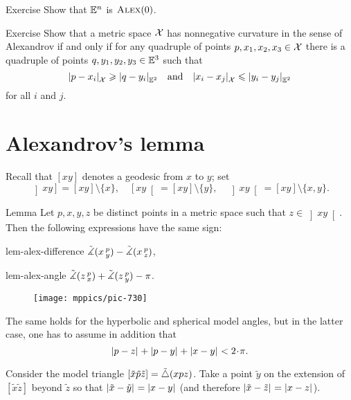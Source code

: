 \begin{thm}{Exercise}\label{ex:Euclid-is-CBB}
Show that $\mathbb{E}^n$ is $\textsc{Alex}(0)$.
\end{thm}

\begin{thm}{Exercise}\label{ex:(3+1)-expanding}
Show that a metric space $\mathcal{X}$ has nonnegative curvature in the sense of Alexandrov
if and only if for any quadruple of points $p,x_1,x_2,x_3\in \mathcal{X}$ 
there is a quadruple of points $q,y_1,y_2,y_3\in\mathbb{E}^3$
such that 
\[\dist{p}{x_i}{\spc{X}}\ge\dist{q}{y_i}{\EE^2} 
\quad \text{and}\quad
\dist{x_i}{x_j}{\spc{X}}\le\dist{y_i}{y_j}{\EE^2}\] 
for all $i$ and $j$.
\end{thm}

\section{Alexandrov's lemma}

Recall that $[xy]$ denotes a geodesic from $x$ to $y$;
set  
\[
\left]x y\right]=[xy]\setminus\{x\},
\quad
\left[x y\right[=[xy]\setminus\{y\},
\quad
\left]x y\right[=[xy]\setminus\{x,y\}.\]

\begin{thm}{Lemma}
\label{lem:alex}  
Let $p,x,y,z$ be distinct points in a metric space such that $z\in \left]x y\right[$.
Then 
the following expressions have the same sign:

\begin{subthm}{lem-alex-difference}
$\tilde\measuredangle(x\,{}^{p}_{y})
-\tilde\measuredangle(x\,{}^{p}_{z})$,
\end{subthm} 

\begin{subthm}{lem-alex-angle}
$\tilde\measuredangle(z\,{}^{p}_{x})
+\tilde\measuredangle(z\,{}^{p}_{y}) -\pi$.
\end{subthm}

\begin{wrapfigure}{r}{25mm}
\vskip-6mm
\centering
\texttt{[image: mppics/pic-730]}
\end{wrapfigure}

The same holds for the hyperbolic and spherical model angles, 
but in the latter case, one has to assume in addition that
\[\dist{p}{z}{}+\dist{p}{y}{}+\dist{x}{y}{}< 2\cdot\pi.\]

\end{thm}

Consider the model triangle $[\tilde x\tilde p\tilde z]=\tilde\triangle(x p z)$.
Take 
a point $\tilde y$ on the extension of 
$[\tilde x \tilde z]$ beyond $\tilde z$ so that $\dist{\tilde x}{\tilde y}{}=\dist{x}{y}{}$ (and therefore $\dist{\tilde x}{\tilde z}{}=\dist{x}{z}{}$). 

